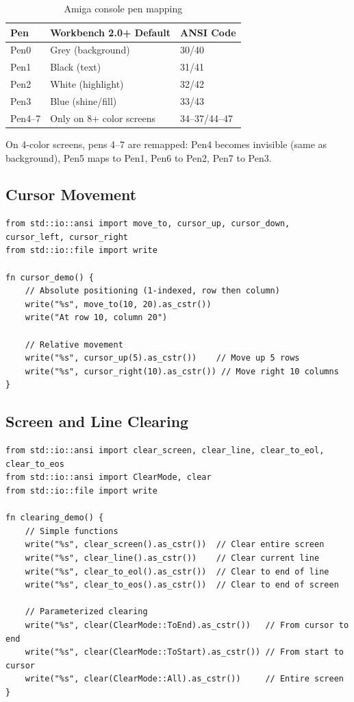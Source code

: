 \begin{table}[h]
\centering
\begin{tabular}{lll}
\textbf{Pen} & \textbf{Workbench 2.0+ Default} & \textbf{ANSI Code} \\
\hline
Pen0 & Grey (background) & 30/40 \\
Pen1 & Black (text) & 31/41 \\
Pen2 & White (highlight) & 32/42 \\
Pen3 & Blue (shine/fill) & 33/43 \\
Pen4--7 & Only on 8+ color screens & 34--37/44--47 \\
\end{tabular}
\caption{Amiga console pen mapping}
\end{table}

\begin{notebox}
On 4-color screens, pens 4--7 are remapped: Pen4 becomes invisible (same as background), Pen5 maps to Pen1, Pen6 to Pen2, Pen7 to Pen3.
\end{notebox}

\subsection{Cursor Movement}

\begin{lstlisting}
from std::io::ansi import move_to, cursor_up, cursor_down, cursor_left, cursor_right
from std::io::file import write

fn cursor_demo() {
    // Absolute positioning (1-indexed, row then column)
    write("%s", move_to(10, 20).as_cstr())
    write("At row 10, column 20")

    // Relative movement
    write("%s", cursor_up(5).as_cstr())    // Move up 5 rows
    write("%s", cursor_right(10).as_cstr()) // Move right 10 columns
}
\end{lstlisting}

\subsection{Screen and Line Clearing}

\begin{lstlisting}
from std::io::ansi import clear_screen, clear_line, clear_to_eol, clear_to_eos
from std::io::ansi import ClearMode, clear
from std::io::file import write

fn clearing_demo() {
    // Simple functions
    write("%s", clear_screen().as_cstr())  // Clear entire screen
    write("%s", clear_line().as_cstr())    // Clear current line
    write("%s", clear_to_eol().as_cstr())  // Clear to end of line
    write("%s", clear_to_eos().as_cstr())  // Clear to end of screen

    // Parameterized clearing
    write("%s", clear(ClearMode::ToEnd).as_cstr())   // From cursor to end
    write("%s", clear(ClearMode::ToStart).as_cstr()) // From start to cursor
    write("%s", clear(ClearMode::All).as_cstr())     // Entire screen
}
\end{lstlisting}


